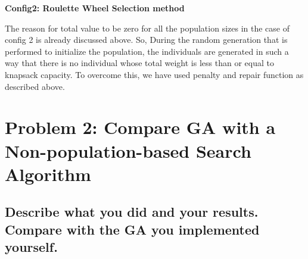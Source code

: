 \documentclass{article}
\begin{document}
{{{{\textbf{Config2: Roulette Wheel Selection method}\\
\begin{table}[H]
\centering
{}
\caption{Best Individual selected from all the trails} 
\end{table} 
The reason for total value to be zero for all the population sizes in the case of config 2 is already discussed above. So, During the random generation that is performed to initialize the population, the individuals are generated in such a way that there is no individual whose total weight is less than or equal to knapsack capacity. To overcome this, we have used penalty and repair function as described above.


\section*{Problem 2: Compare GA with a Non-population-based Search Algorithm}
\subsection*{\textbf{Describe what you did and your results. Compare with
the GA you implemented yourself.}}\\

}}}}
\end{document}
